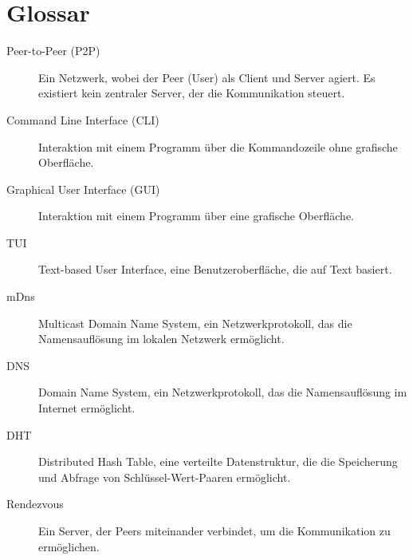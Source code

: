 \section*{Glossar}

\begin{description}
    \item[Peer-to-Peer (P2P)] Ein Netzwerk, wobei der Peer (User) als Client und Server agiert. Es existiert kein zentraler Server, der die Kommunikation steuert.
    \item[Command Line Interface (CLI)] Interaktion mit einem Programm über die Kommandozeile ohne grafische Oberfläche.
    \item[Graphical User Interface (GUI)] Interaktion mit einem Programm über eine grafische Oberfläche.
    \item[TUI] Text-based User Interface, eine Benutzeroberfläche, die auf Text basiert.
    \item[mDns] Multicast Domain Name System, ein Netzwerkprotokoll, das die Namensauflösung im lokalen Netzwerk ermöglicht.
    \item[DNS] Domain Name System, ein Netzwerkprotokoll, das die Namensauflösung im Internet ermöglicht.
    \item[DHT] Distributed Hash Table, eine verteilte Datenstruktur, die die Speicherung und Abfrage von Schlüssel-Wert-Paaren ermöglicht.
    \item[Rendezvous] Ein Server, der Peers miteinander verbindet, um die Kommunikation zu ermöglichen.
\end{description}


\newpage